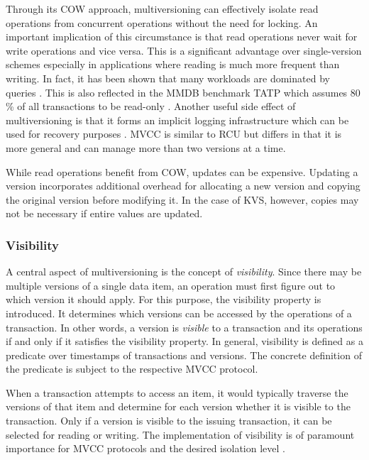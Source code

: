Through its \ac{COW} approach, multiversioning can effectively isolate read
operations from concurrent operations without the need for locking. An important
implication of this circumstance is that read operations never wait for write
operations and vice versa. This is a significant advantage over single-version
schemes especially in applications where reading is much more frequent than
writing. In fact, it has been shown that many workloads are dominated by queries
\cite{krueger2011fast, andrei2017sap}. This is also reflected in the \ac{MMDB}
benchmark TATP which assumes 80 \% of all transactions to be read-only
\cite{larson2011high}. Another useful side effect of multiversioning is that it
forms an implicit logging infrastructure which can be used for recovery
purposes \cite{condit2009better, venkataraman2011consistent}. \ac{MVCC} is
similar to \ac{RCU} \cite{mckenney1998read} but differs in that it is more
general and can manage more than two versions at a time.

While read operations benefit from \ac{COW}, updates can be expensive.
Updating a version incorporates additional overhead for allocating a new version
and copying the original version before modifying it. In the case of \ac{KVS},
however, copies may not be necessary if entire values are updated.

\subsubsection{Visibility}

A central aspect of multiversioning is the concept of \emph{visibility}. Since
there may be multiple versions of a single data item, an operation must first
figure out to which version it should apply. For this purpose, the visibility
property is introduced. It determines which versions can be accessed by the
operations of a transaction. In other words, a version is \emph{visible} to a
transaction and its operations if and only if it satisfies the visibility
property. In general, visibility is defined as a predicate over timestamps of
transactions and versions. The concrete definition of the predicate is subject
to the respective \ac{MVCC} protocol.

When a transaction attempts to access an item, it would typically traverse
the versions of that item and determine for each version whether it is visible
to the transaction. Only if a version is visible to the issuing transaction, it
can be selected for reading or writing. The implementation of visibility is of
paramount importance for \ac{MVCC} protocols and the desired isolation level
\cite{larson2011high}.

